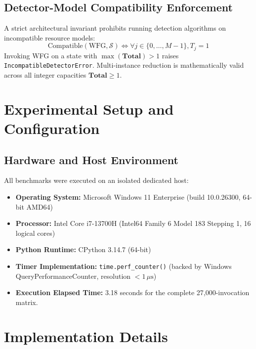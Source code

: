 \documentclass[11pt,a4paper]{article}
\begin{document}
\subsection{Detector-Model Compatibility Enforcement}
A strict architectural invariant prohibits running detection algorithms on incompatible resource models:
\begin{equation}
    \text{Compatible}(\text{WFG}, \mathcal{S}) \iff \forall j \in \{0, \dots, M-1\}, T_j = 1
\end{equation}
Invoking WFG on a state with $\max(\mathbf{Total}) > 1$ raises \texttt{IncompatibleDetectorError}. Multi-instance reduction is mathematically valid across all integer capacities $\mathbf{Total} \ge 1$.

\section{Experimental Setup and Configuration}

\subsection{Hardware and Host Environment}
All benchmarks were executed on an isolated dedicated host:
\begin{itemize}
    \item \textbf{Operating System:} Microsoft Windows 11 Enterprise (build 10.0.26300, 64-bit AMD64)
    \item \textbf{Processor:} Intel Core i7-13700H (Intel64 Family 6 Model 183 Stepping 1, 16 logical cores)
    \item \textbf{Python Runtime:} CPython 3.14.7 (64-bit)
    \item \textbf{Timer Implementation:} \texttt{time.perf\_counter()} (backed by Windows QueryPerformanceCounter, resolution $< 1\,\mu\text{s}$)
    \item \textbf{Execution Elapsed Time:} 3.18 seconds for the complete 27,000-invocation matrix.
\end{itemize}

\section{Implementation Details}
\end{document}
